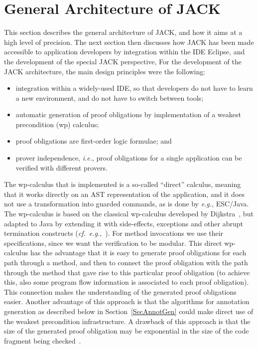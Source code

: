 
\section{General Architecture of JACK}\label{SecArchitecture}

This section describes the general architecture of JACK, and how it
aims at a high level of precision.  The next section then discusses
how JACK has been made accessible to application developers by
integration within the IDE Eclipse, and the development of the special
JACK perspective, For the development of the JACK architecture, the
main design principles were the following:
\begin{itemize}
\item integration within a widely-used IDE, so that developers do not
have to learn a new environment, and do not have to switch between tools;
\item automatic generation of proof obligations by
implementation of a weakest precondition (wp) calculus;
\item proof obligations are first-order logic formulae; and
\item prover independence, \emph{i.e.}, proof obligations for
a single application can be verified with different provers.
\end{itemize}

The wp-calculus that is implemented is a so-called ``direct''
calculus, meaning that it works directly on an AST representation of
the application, and it does not use a transformation into guarded
commands, as is done by \emph{e.g.},  ESC/Java.  The wp-calculus is
based on the classical wp-calculus developed by
Dijkstra~\cite{Dijkstra75}, but adapted to Java by extending it with
side-effects, exceptions and other abrupt termination constructs
(\emph{cf.}\
\emph{e.g.},~\cite{Jacobs04}).
For method invocations we use their specifications, since we want
the verification to be modular.
This direct wp-calculus has the advantage
that it is easy to generate proof obligations for each path through a
method, and then to connect the proof obligation with the path through
the method that gave rise to this particular proof obligation (to
achieve this, also some program flow information is associated to each
proof obligation). This connection makes the understanding of the
generated proof obligations easier. Another advantage of this approach
is that the algorithms for annotation generation as described below in
Section~\ref{SecAnnotGen} could make direct use of the weakest
precondition infrastructure. A drawback of this approach is that the
size of the generated proof obligation may be exponential in the size
of the code fragment being checked~\cite{FlanaganS01}.


